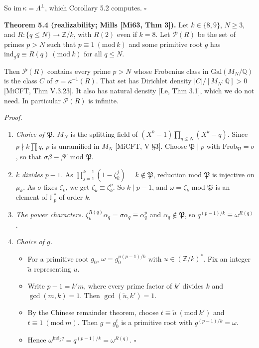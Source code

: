 \documentclass[
]{amsart}
\providecommand{\tightlist}{%
  \setlength{\itemsep}{0pt}\setlength{\parskip}{0pt}}
\begin{document}
So \(\mathrm{im}\,\kappa=\Lambda^\perp\), which Corollary 5.2 computes.
\(\square\)

\textbf{Theorem 5.4 (realizability; Mills {[}Mi63, Thm 3{]}).} Let
\(k\in\{8,9\}\), \(N\ge3\), and \(R:\{q\le N\}\to\mathbb{Z}/k\), with
\(R(2)\) even if \(k=8\). Let \(\mathcal{P}(R)\) be the set of primes
\(p>N\) such that \(p\equiv1\ (\mathrm{mod}\ k)\) and some primitive
root \(g\) has \(\mathrm{ind}_gq\equiv R(q)\ (\mathrm{mod}\ k)\) for all
\(q\le N\).

Then \(\mathcal{P}(R)\) contains every prime \(p>N\) whose Frobenius
class in \(\mathrm{Gal}(M_N/\mathbb{Q})\) is the class \(C\) of
\(\sigma=\kappa^{-1}(R)\). That set has Dirichlet density
\(|C|/[M_N:\mathbb{Q}]>0\) {[}MiCFT, Thm V.3.23{]}. It also has natural
density {[}Le, Thm 3.1{]}, which we do not need. In particular
\(\mathcal{P}(R)\) is infinite.

\emph{Proof.}

\begin{enumerate}
\def\labelenumi{\arabic{enumi}.}
\tightlist
\item
  \emph{Choice of \(\mathfrak P\).} \(M_N\) is the splitting field of
  \((X^k-1)\prod_{q\le N}(X^k-q)\). Since \(p\nmid k\prod q\), \(p\) is
  unramified in \(M_N\) {[}MiCFT, V §3{]}. Choose \(\mathfrak P\mid p\)
  with \(\mathrm{Frob}_{\mathfrak P}=\sigma\), so that
  \(\sigma\beta\equiv\beta^p\) mod \(\mathfrak P\).
\item
  \emph{\(k\) divides \(p-1\).} As
  \(\prod_{j=1}^{k-1}(1-\zeta_k^j)=k\notin\mathfrak P\), reduction mod
  \(\mathfrak P\) is injective on \(\mu_k\). As \(\sigma\) fixes
  \(\zeta_k\), we get \(\zeta_k\equiv\zeta_k^p\). So \(k\mid p-1\), and
  \(\omega=\zeta_k\) mod \(\mathfrak P\) is an element of
  \(\mathbb{F}_p^*\) of order \(k\).
\item
  \emph{The power characters.}
  \(\zeta_k^{R(q)}\alpha_q=\sigma\alpha_q\equiv\alpha_q^p\) and
  \(\alpha_q\notin\mathfrak P\), so \(q^{(p-1)/k}\equiv\omega^{R(q)}\).
\item
  \emph{Choice of \(g\).}

  \begin{itemize}
  \tightlist
  \item
    For a primitive root \(g_0\), \(\omega=g_0^{u(p-1)/k}\) with
    \(u\in(\mathbb{Z}/k)^*\). Fix an integer \(\tilde u\) representing
    \(u\).
  \item
    Write \(p-1=k'm\), where every prime factor of \(k'\) divides \(k\)
    and \(\gcd(m,k)=1\). Then \(\gcd(\tilde u,k')=1\).
  \item
    By the Chinese remainder theorem, choose
    \(t\equiv\tilde u\ (\mathrm{mod}\ k')\) and
    \(t\equiv1\ (\mathrm{mod}\ m)\). Then \(g=g_0^t\) is a primitive
    root with \(g^{(p-1)/k}=\omega\).
  \item
    Hence \(\omega^{\mathrm{ind}_gq}=q^{(p-1)/k}=\omega^{R(q)}\).
    \(\square\)
  \end{itemize}
\end{enumerate}
\end{document}
